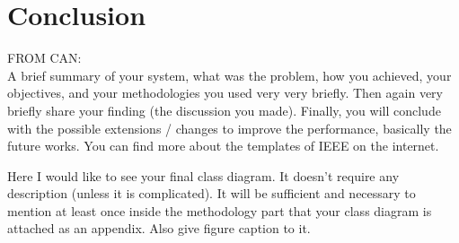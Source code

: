 \documentclass[journal]{IEEEtran}
\begin{document}
%





\section{Conclusion}
FROM CAN:
\\
A brief summary of your system, what was the problem, how you achieved, your objectives, and your methodologies you used very very briefly. Then again very briefly share your finding (the discussion you made). Finally, you will conclude with the possible extensions / changes to improve the performance, basically the future works. You can find more about the templates of IEEE on the internet.





Here I would like to see your final class diagram. It doesn’t require any description (unless it is complicated). It will be sufficient and necessary to mention at least once inside the methodology part that your class diagram is attached as an appendix. Also give figure caption to it.
\end{document}
